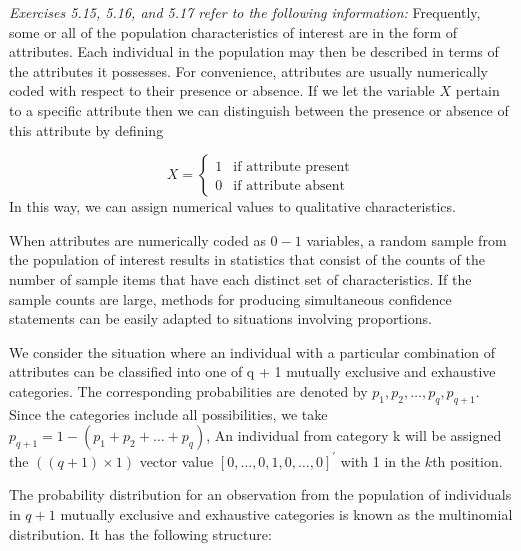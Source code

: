 \textit{Exercises 5.15, 5.16, and 5.17 refer to the following information:}
\newline
\newline
Frequently, some or all of the population characteristics of interest are in the form of
attributes. Each individual in the population may then be described in terms of the
attributes it possesses. For convenience, attributes are usually numerically coded with respect
to their presence or absence. If we let the variable $X$ pertain to a specific attribute
then we can distinguish between the presence or absence of this attribute by defining

\[
    X
    =
    \begin{cases}
        1 & \text{if attribute present} \\
        0 & \text{if attribute absent}
    \end{cases}
\]
\newline
In this way, we can assign numerical values to qualitative characteristics.
\par
When attributes are numerically coded as $0-1$ variables, a random sample from the
population of interest results in statistics that consist of the counts of the number of
sample items that have each distinct set of characteristics. If the sample counts are
large, methods for producing simultaneous confidence statements can be easily adapted
to situations involving proportions.
\par
We consider the situation where an individual with a particular combination of
attributes can be classified into one of q + 1 mutually exclusive and exhaustive
categories. The corresponding probabilities are denoted by $p_{1}, p_{2}, \dots, p_{q}, p_{q+1}$. Since
the categories include all possibilities, we take $p_{q+1} = 1 - (p_{1} + p_{2} + \dots + p_{q})$, An
individual from category k will be assigned the $( ( q + 1) \times 1 )$ vector value ${[ 0, \dots , 0, 1, 0, \dots , 0]}^{\prime}$ with 1 in the $k$th position.
\par
The probability distribution for an observation from the population of individuals in
$q + 1$ mutually exclusive and exhaustive categories is known as the multinomial distribution.
It has the following structure:

